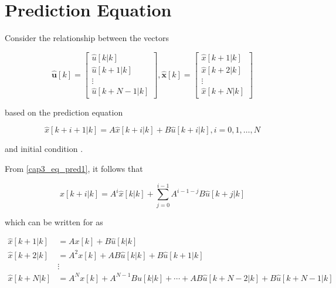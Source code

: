 \section{Prediction Equation}

Consider the relationship between the vectors

\begin{equation}
	\mathbf{\hat{u}}[k] = \left[
		\begin{matrix}
			\hat{u}[k | k] \\ 
			\hat{u}[k + 1 | k] \\ 
			\vdots \\ 
			\hat{u}[k + N-1 | k]
		\end{matrix}
	\right],
	\mathbf{\hat{x}}[k] = 
		\left[
		\begin{matrix}
			\hat{x}[k + 1 | k] \\ 
			\hat{x}[k + 2 | k] \\ 
			\vdots \\ 
			\hat{x}[k + N | k]
		\end{matrix}
	\right]
\end{equation}

\noindent
based on the prediction equation

\noindent
\begin{equation}
	\label{cap3_eq_pred1}
	\hat{x}[k + i +1|k] = A\hat{x}[k+i|k] + B \hat{u}[k+i|k], 
	i = 0, 1, \ldots, N 
\end{equation}

\noindent
and initial condition .

From \eqref{cap3_eq_pred1}, it follows that

\begin{equation}
	\hat{x}[k+i|k] = A^i\hat{x}[k|k] + \sum_{j=0}^{i-1} A^{i - 1 -j} B \hat{u}[k+j|k]
\end{equation}

\noindent
which can be written for  as

\noindent
\begin{align}
	\hat{x}[k+1|k] &= A x[k] +  B \hat{u}[k|k] \\
	\hat{x}[k+2|k] &= A^2 x[k] + A B \hat{u}[k|k] +  B \hat{u}[k+1|k] \\
	&\vdots \\
	\hat{x}[k+N|k] &= A^N x[k] + A^{N - 1} B \hat{u}[k|k] + \cdots + A B \hat{u}[k +N - 2|k] +  B \hat{u}[k + N - 1|k]
\end{align}

